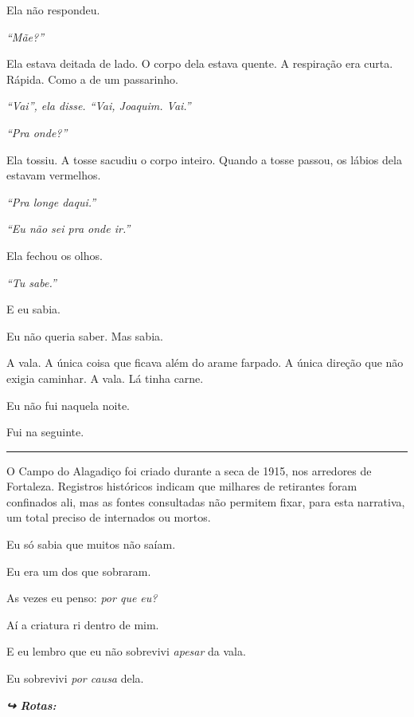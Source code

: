 \noindent Ela não respondeu.

\noindent \textit{\textquotedblleft{}Mãe?\textquotedblright{}}

\noindent Ela estava deitada de lado. O corpo dela estava quente. A respiração era curta. Rápida. Como a de um passarinho.

\noindent \textit{\textquotedblleft{}Vai\textquotedblright{}\textit{, ela disse. }\textquotedblleft{}Vai, Joaquim. Vai.\textquotedblright{}}

\noindent \textit{\textquotedblleft{}Pra onde?\textquotedblright{}}

\noindent Ela tossiu. A tosse sacudiu o corpo inteiro. Quando a tosse passou, os lábios dela estavam vermelhos.

\noindent \textit{\textquotedblleft{}Pra longe daqui.\textquotedblright{}}

\noindent \textit{\textquotedblleft{}Eu não sei pra onde ir.\textquotedblright{}}

\noindent Ela fechou os olhos.

\noindent \textit{\textquotedblleft{}Tu sabe.\textquotedblright{}}

\noindent E eu sabia.

\noindent Eu não queria saber. Mas sabia.

\noindent A vala. A única coisa que ficava além do arame farpado. A única direção que não exigia caminhar. A vala. Lá tinha carne.

\noindent Eu não fui naquela noite.

\noindent Fui na seguinte.

\vspace{0.5em}\noindent\rule{\textwidth}{0.5pt}\vspace{0.5em}

\noindent O Campo do Alagadiço foi criado durante a seca de 1915, nos arredores de Fortaleza. Registros históricos indicam que milhares de retirantes foram confinados ali, mas as fontes consultadas não permitem fixar, para esta narrativa, um total preciso de internados ou mortos.

\noindent Eu só sabia que muitos não saíam.

\noindent Eu era um dos que sobraram.

\noindent As vezes eu penso: \textit{por que eu?}

\noindent Aí a criatura ri dentro de mim.

\noindent E eu lembro que eu não sobrevivi \textit{apesar} da vala.

\noindent Eu sobrevivi \textit{por causa} dela.

\vspace{0.5em}
\noindent\textit{\textbf{↪ Rotas:}  \rotasep {}}
